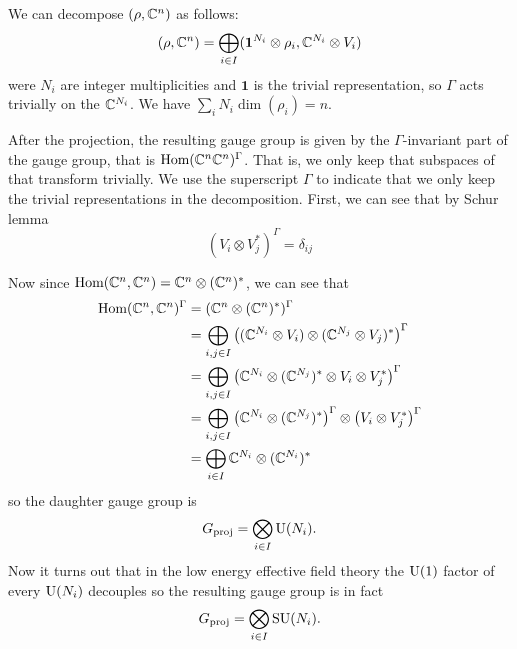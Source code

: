 \documentclass[a4paper,11pt]{article}
\begin{document}
        We can decompose $(\rho,\mathbb{C}^n)$ as follows:
        \begin{equation}
            (\rho,\mathbb{C}^n)=\bigoplus_{i\in I}  (\boldsymbol{1}^{N_i}\otimes\rho_i,\mathbb{C}^{N_i}\otimes V_i)
        \end{equation}
        were $N_i$ are integer multiplicities and $\boldsymbol{1}$ is the trivial representation, so $\Gamma$ acts trivially on the $\mathbb{C}^{N_i}$. We have $\sum_iN_i\dim(\rho_i)=n$. 
        
        After the projection, the resulting gauge group is given by the $\Gamma$-invariant part of the gauge group, that is $\text{Hom}(\mathbb{C}^n\mathbb{C}^n)^\Gamma$. That is, we only keep that subspaces of that transform trivially. We use the superscript $\Gamma$ to indicate that we only keep the trivial representations in the decomposition. First, we can see that by Schur lemma \marker
        \begin{equation}
            (V_i\otimes V^*_j)^\Gamma=\delta_{ij}
        \end{equation}
        
        Now since $\text{Hom}(\mathbb{C}^n,\mathbb{C}^n)=\mathbb{C}^n\otimes(\mathbb{C}^n)^*$, we can see that
        \begin{align}
            \text{Hom}(\mathbb{C}^n,\mathbb{C}^n)^\Gamma &= (\mathbb{C}^n\otimes(\mathbb{C}^n)^*)^\Gamma\\
            &= \bigoplus_{i,j\in I} \left((\mathbb{C}^{N_i}\otimes V_i)\otimes(\mathbb{C}^{N_j}\otimes V_j)^*\right)^\Gamma\\
            &= \bigoplus_{i,j\in I} \left(\mathbb{C}^{N_i}\otimes(\mathbb{C}^{N_j})^*\otimes V_i\otimes V^*_j\right)^\Gamma\\
            &= \bigoplus_{i,j\in I} \left(\mathbb{C}^{N_i}\otimes(\mathbb{C}^{N_j})^*\right)^\Gamma\otimes\left(V_i\otimes V^*_j\right)^\Gamma\\
            &= \bigoplus_{i\in I}\mathbb{C}^{N_i}\otimes(\mathbb{C}^{N_i})^*
        \end{align}
        so the daughter gauge group is
        \begin{equation}
            G_{\text{proj}} = \bigotimes_{i\in I}\text{U}(N_i).
        \end{equation}
        Now it turns out that in the low energy effective field theory the $\text{U}(1)$ factor of every $\text{U}(N_i)$ decouples \marker so the resulting gauge group is in fact
        \begin{equation}
            G_{\text{proj}} = \bigotimes_{i\in I}\text{SU}(N_i).
        \end{equation}
\end{document}
